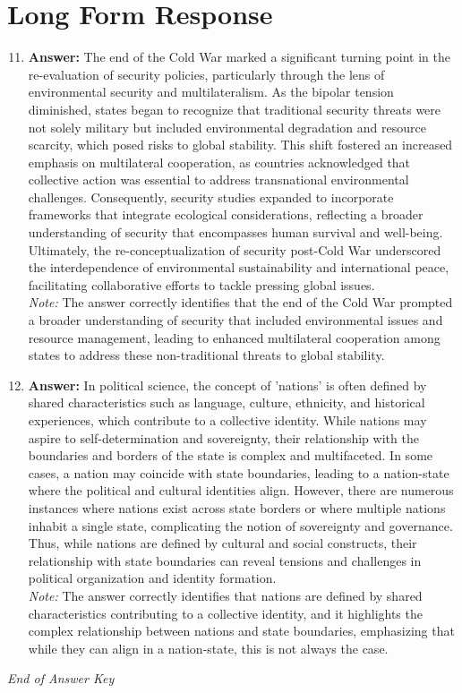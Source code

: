 \documentclass[12pt]{article}
\begin{document}
\section*{Long Form Response}
\begin{enumerate}[label=\arabic*.]
\setcounter{enumi}{10}
\item \textbf{Answer:} The end of the Cold War marked a significant turning point in the re-evaluation of security policies, particularly through the lens of environmental security and multilateralism. As the bipolar tension diminished, states began to recognize that traditional security threats were not solely military but included environmental degradation and resource scarcity, which posed risks to global stability. This shift fostered an increased emphasis on multilateral cooperation, as countries acknowledged that collective action was essential to address transnational environmental challenges. Consequently, security studies expanded to incorporate frameworks that integrate ecological considerations, reflecting a broader understanding of security that encompasses human survival and well-being. Ultimately, the re-conceptualization of security post-Cold War underscored the interdependence of environmental sustainability and international peace, facilitating collaborative efforts to tackle pressing global issues.
\\ \textit{Note:} The answer correctly identifies that the end of the Cold War prompted a broader understanding of security that included environmental issues and resource management, leading to enhanced multilateral cooperation among states to address these non-traditional threats to global stability.
\item \textbf{Answer:} In political science, the concept of 'nations' is often defined by shared characteristics such as language, culture, ethnicity, and historical experiences, which contribute to a collective identity. While nations may aspire to self-determination and sovereignty, their relationship with the boundaries and borders of the state is complex and multifaceted. In some cases, a nation may coincide with state boundaries, leading to a nation-state where the political and cultural identities align. However, there are numerous instances where nations exist across state borders or where multiple nations inhabit a single state, complicating the notion of sovereignty and governance. Thus, while nations are defined by cultural and social constructs, their relationship with state boundaries can reveal tensions and challenges in political organization and identity formation.
\\ \textit{Note:} The answer correctly identifies that nations are defined by shared characteristics contributing to a collective identity, and it highlights the complex relationship between nations and state boundaries, emphasizing that while they can align in a nation-state, this is not always the case.
\end{enumerate}

\vfill
\noindent\textit{End of Answer Key}
\end{document}
